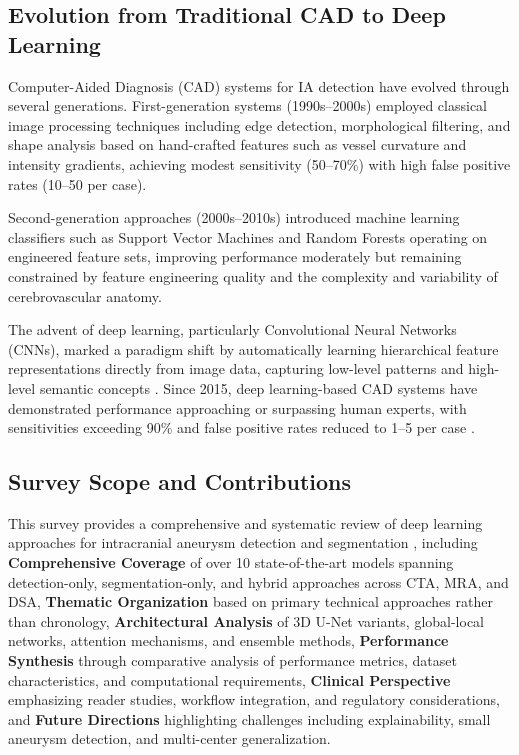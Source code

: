 \documentclass[conference]{IEEEtran}
\begin{document}
\subsection{Evolution from Traditional CAD to Deep Learning}

Computer-Aided Diagnosis (CAD) systems for IA detection have evolved through several generations. First-generation systems (1990s–2000s) employed classical image processing techniques including edge detection, morphological filtering, and shape analysis based on hand-crafted features such as vessel curvature and intensity gradients, achieving modest sensitivity (50–70\%) with high false positive rates (10–50 per case).

Second-generation approaches (2000s–2010s) introduced machine learning classifiers such as Support Vector Machines and Random Forests operating on engineered feature sets, improving performance moderately but remaining constrained by feature engineering quality and the complexity and variability of cerebrovascular anatomy.

The advent of deep learning, particularly Convolutional Neural Networks (CNNs), marked a paradigm shift by automatically learning hierarchical feature representations directly from image data, capturing low-level patterns and high-level semantic concepts \cite{litjens2017survey}. Since 2015, deep learning-based CAD systems have demonstrated performance approaching or surpassing human experts, with sensitivities exceeding 90\% and false positive rates reduced to 1–5 per case \cite{bo2021toward,park2019headxnet}.

\subsection{Survey Scope and Contributions}

This survey provides a comprehensive and systematic review of deep learning approaches for intracranial aneurysm detection and segmentation \cite{hsu2025survey}, including \textbf{Comprehensive Coverage} of over 10 state-of-the-art models spanning detection-only, segmentation-only, and hybrid approaches across CTA, MRA, and DSA, \textbf{Thematic Organization} based on primary technical approaches rather than chronology, \textbf{Architectural Analysis} of 3D U-Net variants, global-local networks, attention mechanisms, and ensemble methods, \textbf{Performance Synthesis} through comparative analysis of performance metrics, dataset characteristics, and computational requirements, \textbf{Clinical Perspective} emphasizing reader studies, workflow integration, and regulatory considerations, and \textbf{Future Directions} highlighting challenges including explainability, small aneurysm detection, and multi-center generalization.
\end{document}
